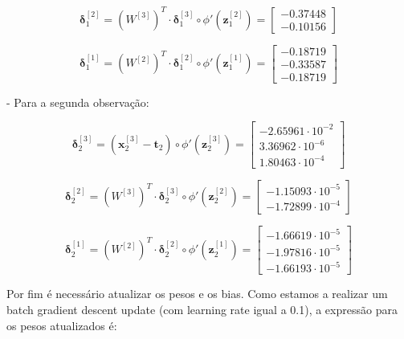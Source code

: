 \documentclass[a4paper,12pt]{article} %
\begin{document}
\begin{enumerate}
\begin{equation*}
    \bm{\delta}^{[2]}_1 = (W^{[3]})^T \cdot \bm{\delta}^{[3]}_1 \circ \phi'(\textbf{z}^{[2]}_1) = \begin{bmatrix} -0.37448\\ -0.10156 \end{bmatrix}
\end{equation*}

\begin{equation*}
    \bm{\delta}^{[1]}_1 = (W^{[2]})^T \cdot \bm{\delta}^{[2]}_1 \circ \phi'(\textbf{z}^{[1]}_1) = \begin{bmatrix} -0.18719 \\ -0.33587 \\ -0.18719 \end{bmatrix}
\end{equation*}

- Para a segunda observação:

\begin{equation*}
    \bm{\delta}^{[3]}_2 = (\textbf{x}^{[3]}_2 - \textbf{t}_2) \circ \phi'(\textbf{z}^{[3]}_2) = \begin{bmatrix} -2.65961\cdot 10^{-2} \\ 3.36962\cdot 10^{-6} \\ 1.80463\cdot 10^{-4} \end{bmatrix}
\end{equation*}

\begin{equation*}
    \bm{\delta}^{[2]}_2 = (W^{[3]})^T \cdot \bm{\delta}^{[3]}_2 \circ \phi'(\textbf{z}^{[2]}_2) = \begin{bmatrix} -1.15093\cdot 10^{-5} \\ -1.72899 \cdot 10^{-4} \end{bmatrix}
\end{equation*}

\begin{equation*}
    \bm{\delta}^{[1]}_2 = (W^{[2]})^T \cdot \bm{\delta}^{[2]}_2 \circ \phi'(\textbf{z}^{[1]}_2) = \begin{bmatrix} -1.66619\cdot 10^{-5} \\ -1.97816 \cdot 10^{-5} \\ -1.66193\cdot 10^{-5} \end{bmatrix}
\end{equation*}

Por fim é necessário atualizar os pesos e os bias. Como estamos a realizar um batch gradient descent update (com learning rate igual a 0.1), a expressão para os pesos atualizados é:


\end{enumerate}
\end{document}
